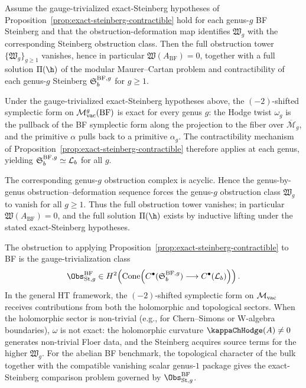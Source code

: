 \begin{corollary}
\label{cor:bf-modular-lifting-resolved}
Assume the gauge-trivialized exact-Steinberg hypotheses of
Proposition~\ref{prop:exact-steinberg-contractible} hold for each
genus-$g$ BF Steinberg and that the obstruction-deformation map
identifies $\mathfrak W_g$ with the corresponding Steinberg obstruction
class. Then the full obstruction tower $\{\mathfrak{W}_g\}_{g\ge 1}$ vanishes,
hence in particular $\mathfrak{W}(A_{\mathrm{BF}})=0$, together with a
full solution $\Pi(\h)$ of the modular Maurer--Cartan problem and
contractibility of each genus-$g$ Steinberg
$\mathfrak{S}_b^{\mathrm{BF},g}$ for $g \geq 1$.
\end{corollary}

\begin{remark}
Under the gauge-trivialized exact-Steinberg hypotheses above, the $(-2)$-shifted
symplectic form on $\mathcal{M}_{\mathrm{vac}}^g(\mathrm{BF})$ is exact for every genus $g$:
the Hodge twist $\omega_g$ is the pullback of the BF symplectic form
along the projection to the fiber over $\overline{\mathcal{M}}_g$,
and the primitive $\alpha$ pulls back to a primitive $\alpha_g$. The
contractibility mechanism of Proposition~\ref{prop:exact-steinberg-contractible}
therefore applies at each genus, yielding
$\mathfrak{S}_b^{\mathrm{BF},g} \simeq \mathcal{L}_b$ for all $g$.

The corresponding genus-$g$ obstruction complex is acyclic. Hence the
genus-by-genus obstruction--deformation sequence forces the genus-$g$
obstruction class $\mathfrak{W}_g$ to vanish for all $g \geq 1$.
Thus the full obstruction tower vanishes; in particular
$\mathfrak{W}(A_{\mathrm{BF}})=0$, and the full solution $\Pi(\h)$ exists by
inductive lifting under the stated exact-Steinberg hypotheses.
\end{remark}

\begin{remark}
The obstruction to applying Proposition~\ref{prop:exact-steinberg-contractible}
to BF is the gauge-trivialization class
\[
\Obs^{\mathrm{BF}}_{\mathrm{St},g}\in
H^2\!\left(\Cone\!\left(C^\bullet(\Steinberg_b^{\mathrm{BF},g})
\longrightarrow C^\bullet(\mathcal L_b)\right)\right).
\]
In the general HT framework, the
$(-2)$-shifted symplectic form on $\mathcal{M}_{\mathrm{vac}}$ receives contributions from
both the holomorphic and topological sectors. When the holomorphic
sector is non-trivial (e.g., for Chern--Simons or W-algebra
boundaries), $\omega$ is not exact: the holomorphic curvature
$\kappaChHodge(A) \neq 0$ generates non-trivial Floer data, and the
Steinberg acquires source terms for the higher $\mathfrak{W}_g$.
For the abelian BF benchmark, the topological character of the bulk
together with the compatible vanishing scalar genus-$1$ package gives
the exact-Steinberg comparison problem governed by
$\Obs^{\mathrm{BF}}_{\mathrm{St},g}$.
\end{remark}

